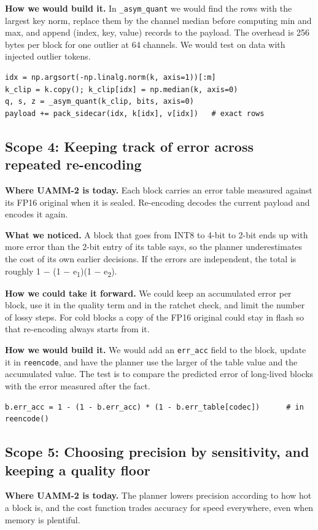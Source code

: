 \documentclass[12pt,a4paper]{report}
\begin{document}
\textbf{How we would build it.} In \texttt{\_\allowbreak{}\allowbreak{}asym\_\allowbreak{}\allowbreak{}quant} we would find the rows with the largest key norm, replace them by the channel median before computing min and max, and append (index, key, value) records to the payload. The overhead is 256 bytes per block for one outlier at 64 channels. We would test on data with injected outlier tokens.

\begin{lstlisting}
idx = np.argsort(-np.linalg.norm(k, axis=1))[:m]
k_clip = k.copy(); k_clip[idx] = np.median(k, axis=0)
q, s, z = _asym_quant(k_clip, bits, axis=0)
payload += pack_sidecar(idx, k[idx], v[idx])   # exact rows
\end{lstlisting}
\subsection{Scope 4: Keeping track of error across repeated re-encoding}
\textbf{Where UAMM-2 is today.} Each block carries an error table measured against its FP16 original when it is sealed. Re-encoding decodes the current payload and encodes it again.

\textbf{What we noticed.} A block that goes from INT8 to 4-bit to 2-bit ends up with more error than the 2-bit entry of its table says, so the planner underestimates the cost of its own earlier decisions. If the errors are independent, the total is roughly 1 − (1 − e\textsubscript{1})(1 − e\textsubscript{2}).

\textbf{How we could take it forward.} We could keep an accumulated error per block, use it in the quality term and in the ratchet check, and limit the number of lossy steps. For cold blocks a copy of the FP16 original could stay in flash so that re-encoding always starts from it.

\textbf{How we would build it.} We would add an \texttt{err\_\allowbreak{}\allowbreak{}acc} field to the block, update it in \texttt{reencode}, and have the planner use the larger of the table value and the accumulated value. The test is to compare the predicted error of long-lived blocks with the error measured after the fact.

\begin{lstlisting}
b.err_acc = 1 - (1 - b.err_acc) * (1 - b.err_table[codec])      # in reencode()
\end{lstlisting}
\subsection{Scope 5: Choosing precision by sensitivity, and keeping a quality floor}
\textbf{Where UAMM-2 is today.} The planner lowers precision according to how hot a block is, and the cost function trades accuracy for speed everywhere, even when memory is plentiful.
\end{document}
